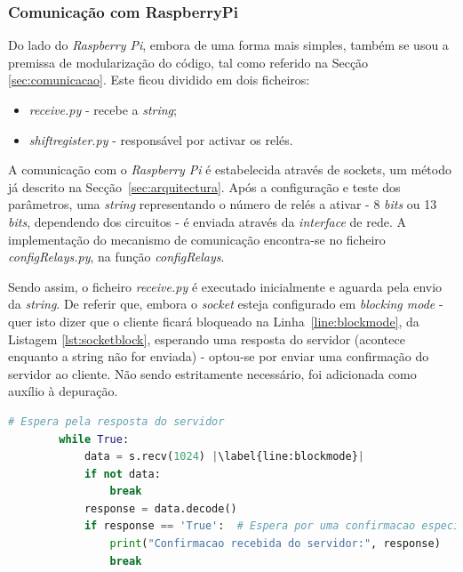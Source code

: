 \subsubsection{Comunicação com RaspberryPi}
\label{sec:raspberrypi}
Do lado do \textit{Raspberry Pi}, embora de uma forma mais simples, também se usou a premissa de modularização do código, tal como referido na Secção \ref{sec:comunicacao}. Este ficou dividido em dois ficheiros:
\begin{itemize}
	\item \textit{receive.py} - recebe a \textit{string};
	\item \textit{shift\textunderscore register.py} - responsável por activar os relés.
\end{itemize}

A comunicação com o \textit{Raspberry Pi} é estabelecida através de sockets, um método já descrito na Secção~\ref{sec:arquitectura}. Após a configuração e teste dos parâmetros, uma \textit{string} representando o número de relés a ativar - 8 \textit{bits} ou 13 \textit{bits}, dependendo dos circuitos - é enviada através da \textit{interface} de rede. A implementação do mecanismo de comunicação encontra-se no ficheiro \textit{configRelays.py}, na função \textit{config\textunderscore Relays}.

Sendo assim, o ficheiro \textit{receive.py} é executado inicialmente e aguarda pela envio da \textit{string}. De referir que, embora o \textit{socket} esteja configurado em \textit{blocking mode} - quer isto dizer que o cliente ficará bloqueado na Linha~\ref{line:blockmode}, da Listagem \ref{lst:socketblock}, esperando uma resposta do servidor \cite{Sockets} (acontece enquanto a string não for enviada) - optou-se por enviar uma confirmação do servidor ao cliente. Não sendo estritamente necessário, foi adicionada como auxílio à depuração.

\begin{minipage}{0.9\linewidth}
	\begin{lstlisting}[language=Python,escapechar=|, caption=\textit{Block Mode \textins{Sockets} configRelays.py}, label=lst:socketblock]
		# Espera pela resposta do servidor
        while True:
            data = s.recv(1024) |\label{line:blockmode}|
            if not data:
                break
            response = data.decode()
            if response == 'True':  # Espera por uma confirmacao especifica do servidor
                print("Confirmacao recebida do servidor:", response)
                break
	\end{lstlisting}
\end{minipage}

